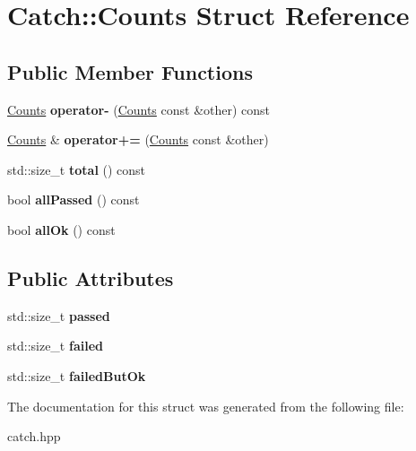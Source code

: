 \hypertarget{struct_catch_1_1_counts}{}\section{Catch\+:\+:Counts Struct Reference}
\label{struct_catch_1_1_counts}
\subsection*{Public Member Functions}
\begin{DoxyCompactItemize}
\item 
\mbox{\label{struct_catch_1_1_counts_aaa10666f559057e3e860d2a5a6fae4c4}} 
\hyperlink{struct_catch_1_1_counts}{Counts} {\bfseries operator-\/} (\hyperlink{struct_catch_1_1_counts}{Counts} const \&other) const
\item 
\mbox{\label{struct_catch_1_1_counts_a322a89475cd2cc039140ef371e973677}} 
\hyperlink{struct_catch_1_1_counts}{Counts} \& {\bfseries operator+=} (\hyperlink{struct_catch_1_1_counts}{Counts} const \&other)
\item 
\mbox{\label{struct_catch_1_1_counts_a94f969c09cf52d1339c085c9603cd1d3}} 
std\+::size\+\_\+t {\bfseries total} () const
\item 
\mbox{\label{struct_catch_1_1_counts_a84999490e0ecaa3de5e121bf48eda1b3}} 
bool {\bfseries all\+Passed} () const
\item 
\mbox{\label{struct_catch_1_1_counts_a33bd996e016030155b99fe1c51c08991}} 
bool {\bfseries all\+Ok} () const
\end{DoxyCompactItemize}
\subsection*{Public Attributes}
\begin{DoxyCompactItemize}
\item 
\mbox{\label{struct_catch_1_1_counts_ad28daaf3de28006400208b6dd0c631e6}} 
std\+::size\+\_\+t {\bfseries passed}
\item 
\mbox{\label{struct_catch_1_1_counts_a19982a3817a3bc2c07f0290e71f497a3}} 
std\+::size\+\_\+t {\bfseries failed}
\item 
\mbox{\label{struct_catch_1_1_counts_ac090973a2ff51394cd452718e75c073e}} 
std\+::size\+\_\+t {\bfseries failed\+But\+Ok}
\end{DoxyCompactItemize}


The documentation for this struct was generated from the following file\+:\begin{DoxyCompactItemize}
\item 
catch.\+hpp\end{DoxyCompactItemize}
